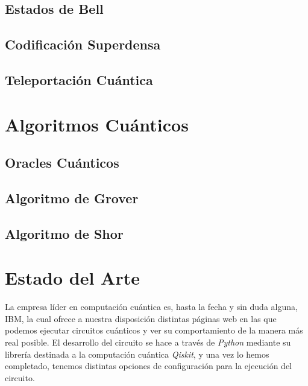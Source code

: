 \documentclass{article}
\numberwithin{equation}{section} %
\begin{document}
    \subsection{Estados de Bell}
    \subsection{Codificación Superdensa}
    \subsection{Teleportación Cuántica}





    \newpage
    \thispagestyle{empty}
    \mbox{}

    \section{Algoritmos Cuánticos}\label{sec: algoritmos_cuanticos}
    \subsection{Oracles Cuánticos}
    \subsection{Algoritmo de Grover}
    \subsection{Algoritmo de Shor}





    \newpage
    \thispagestyle{empty}
    \mbox{}

    \section{Estado del Arte}

    \vspace{5mm}

    La empresa líder en computación cuántica es, hasta la fecha y sin duda alguna, IBM, la cual ofrece a nuestra disposición distintas páginas web en las que podemos ejecutar circuitos cuánticos y ver su comportamiento de la manera más real posible. El desarrollo del circuito se hace a través de \textit{Python} mediante su librería destinada a la computación cuántica \textit{Qiskit}, y una vez lo hemos completado, tenemos distintas opciones de configuración para la ejecución del circuito.
\end{document}
